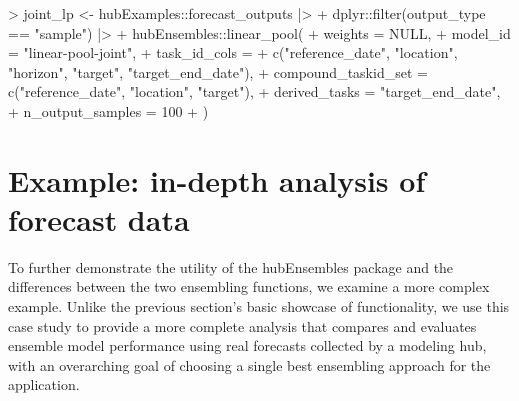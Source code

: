 \documentclass[
  letterpaper,
  DIV=11,
  numbers=noendperiod]{scrartcl}
\newenvironment{Shaded}{\begin{snugshade}}{\end{snugshade}}
\newcommand{\AttributeTok}[1]{\textcolor[rgb]{0.40,0.45,0.13}{#1}}
\newcommand{\ConstantTok}[1]{\textcolor[rgb]{0.56,0.35,0.01}{#1}}
\newcommand{\DecValTok}[1]{\textcolor[rgb]{0.68,0.00,0.00}{#1}}
\newcommand{\FunctionTok}[1]{\textcolor[rgb]{0.28,0.35,0.67}{#1}}
\newcommand{\NormalTok}[1]{\textcolor[rgb]{0.00,0.23,0.31}{#1}}
\newcommand{\OtherTok}[1]{\textcolor[rgb]{0.00,0.23,0.31}{#1}}
\newcommand{\SpecialCharTok}[1]{\textcolor[rgb]{0.37,0.37,0.37}{#1}}
\newcommand{\StringTok}[1]{\textcolor[rgb]{0.13,0.47,0.30}{#1}}
\begin{document}
\begin{Shaded}
\begin{Highlighting}[]
\SpecialCharTok{\textgreater{}}\NormalTok{ joint\_lp }\OtherTok{\textless{}{-}}\NormalTok{ hubExamples}\SpecialCharTok{::}\NormalTok{forecast\_outputs }\SpecialCharTok{|\textgreater{}}
\SpecialCharTok{+}\NormalTok{     dplyr}\SpecialCharTok{::}\FunctionTok{filter}\NormalTok{(output\_type }\SpecialCharTok{==} \StringTok{"sample"}\NormalTok{) }\SpecialCharTok{|\textgreater{}}
\SpecialCharTok{+}\NormalTok{     hubEnsembles}\SpecialCharTok{::}\FunctionTok{linear\_pool}\NormalTok{(}
\SpecialCharTok{+}       \AttributeTok{weights =} \ConstantTok{NULL}\NormalTok{,}
\SpecialCharTok{+}       \AttributeTok{model\_id =} \StringTok{"linear{-}pool{-}joint"}\NormalTok{,}
\SpecialCharTok{+}       \AttributeTok{task\_id\_cols =}
\SpecialCharTok{+}         \FunctionTok{c}\NormalTok{(}\StringTok{"reference\_date"}\NormalTok{, }\StringTok{"location"}\NormalTok{, }\StringTok{"horizon"}\NormalTok{, }\StringTok{"target"}\NormalTok{, }\StringTok{"target\_end\_date"}\NormalTok{),}
\SpecialCharTok{+}       \AttributeTok{compound\_taskid\_set =} \FunctionTok{c}\NormalTok{(}\StringTok{"reference\_date"}\NormalTok{, }\StringTok{"location"}\NormalTok{, }\StringTok{"target"}\NormalTok{),}
\SpecialCharTok{+}       \AttributeTok{derived\_tasks =} \StringTok{"target\_end\_date"}\NormalTok{,}
\SpecialCharTok{+}       \AttributeTok{n\_output\_samples =} \DecValTok{100}
\SpecialCharTok{+}\NormalTok{     )}
\end{Highlighting}
\end{Shaded}

\section{Example: in-depth analysis of forecast
data}\label{sec-case-study}

To further demonstrate the utility of the {hubEnsembles} package and the
differences between the two ensembling functions, we examine a more
complex example. Unlike the previous section's basic showcase of
functionality, we use this case study to provide a more complete
analysis that compares and evaluates ensemble model performance using
real forecasts collected by a modeling hub, with an overarching goal of
choosing a single best ensembling approach for the application.
\end{document}
